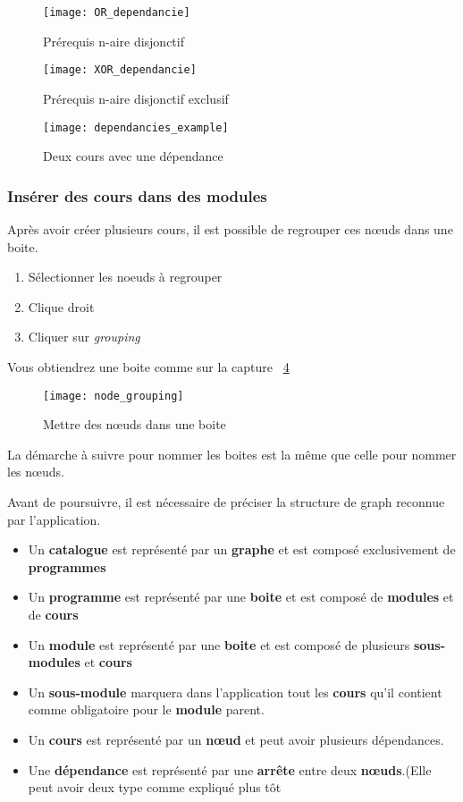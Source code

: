 \begin{figure}[!htb]
\centering
\caption{Prérequis n-aire disjonctif}
\label{fig:or_depandancy}
\texttt{[image: OR\_dependancie]}
\end{figure}

\begin{figure}[!htb]
\centering
\caption{Prérequis n-aire disjonctif exclusif}
\label{fig:xor_depandancy}
\texttt{[image: XOR\_dependancie]}
\end{figure}

\begin{figure}[!htb]
\label{fig:dependancies_example}
\centering
\caption{Deux cours avec une dépendance}
\texttt{[image: dependancies\_example]}

\end{figure}

\subsubsection{Insérer des cours dans des modules}
Après avoir créer plusieurs cours, il est possible de regrouper ces nœuds dans une boite.
\begin{enumerate}
\item Sélectionner les noeuds à regrouper
\item Clique droit
\item Cliquer sur \textit{grouping}
\end{enumerate}

Vous obtiendrez une boite comme sur la capture ~\ref{fig:node_grouping}

\begin{figure}
\centering
\caption{Mettre des nœuds dans une boite}
\label{fig:node_grouping}
\texttt{[image: node\_grouping]}
\end{figure}

La démarche à suivre pour nommer les boites est la même que celle pour nommer les nœuds.

Avant de poursuivre, il est nécessaire de préciser la structure de graph reconnue par l'application. 

\begin{itemize}
\item Un \textbf{catalogue} est représenté par un \textbf{graphe} et est composé exclusivement de \textbf{programmes}
\item Un \textbf{programme} est représenté par une \textbf{boite} et est composé de \textbf{modules} et de \textbf{cours}
\item Un \textbf{module} est représenté par une \textbf{boite} et est composé de plusieurs \textbf{sous-modules} et \textbf{cours}
\item Un \textbf{sous-module} marquera dans l'application tout les \textbf{cours} qu'il contient comme obligatoire pour le \textbf{module} parent.
\item Un \textbf{cours} est représenté par un \textbf{nœud} et peut avoir plusieurs dépendances. 
\item Une \textbf{dépendance} est représenté par une \textbf{arrête} entre deux \textbf{nœuds}.(Elle peut avoir deux type comme expliqué plus tôt
\end{itemize}

